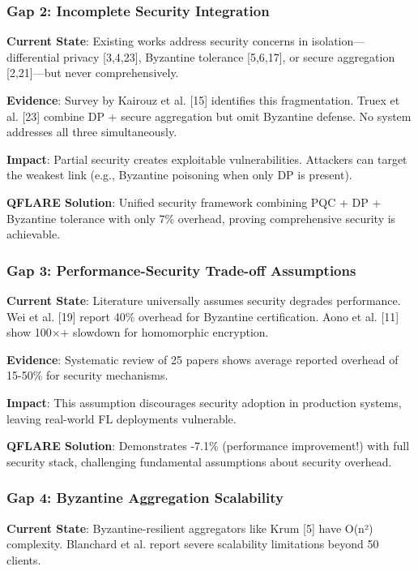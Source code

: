 \documentclass[12pt,a4paper]{article}
\begin{document}
\subsubsection{Gap 2: Incomplete Security Integration}

\textbf{Current State}: Existing works address security concerns in isolation—differential privacy [3,4,23], Byzantine tolerance [5,6,17], or secure aggregation [2,21]—but never comprehensively.

\textbf{Evidence}: Survey by Kairouz et al. [15] identifies this fragmentation. Truex et al. [23] combine DP + secure aggregation but omit Byzantine defense. No system addresses all three simultaneously.

\textbf{Impact}: Partial security creates exploitable vulnerabilities. Attackers can target the weakest link (e.g., Byzantine poisoning when only DP is present).

\textbf{QFLARE Solution}: Unified security framework combining PQC + DP + Byzantine tolerance with only 7\% overhead, proving comprehensive security is achievable.

\subsubsection{Gap 3: Performance-Security Trade-off Assumptions}

\textbf{Current State}: Literature universally assumes security degrades performance. Wei et al. [19] report 40\% overhead for Byzantine certification. Aono et al. [11] show 100×+ slowdown for homomorphic encryption.

\textbf{Evidence}: Systematic review of 25 papers shows average reported overhead of 15-50\% for security mechanisms.

\textbf{Impact}: This assumption discourages security adoption in production systems, leaving real-world FL deployments vulnerable.

\textbf{QFLARE Solution}: Demonstrates -7.1\% (performance improvement!) with full security stack, challenging fundamental assumptions about security overhead.

\subsubsection{Gap 4: Byzantine Aggregation Scalability}

\textbf{Current State}: Byzantine-resilient aggregators like Krum [5] have O(n²) complexity. Blanchard et al. report severe scalability limitations beyond 50 clients.
\end{document}
